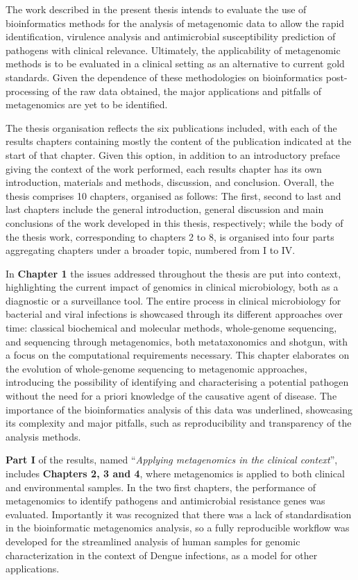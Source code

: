 The work described in the present thesis intends to evaluate the use of bioinformatics methods for the analysis of metagenomic data to allow the rapid identification, virulence analysis and antimicrobial susceptibility prediction of pathogens with clinical relevance. Ultimately, the applicability of metagenomic methods is to be evaluated in a clinical setting as an alternative to current gold standards. Given the dependence of these methodologies on bioinformatics post-processing of the raw data obtained, the major applications and pitfalls of metagenomics are yet to be identified. 

The thesis organisation reflects the six publications included, with each of the results chapters containing mostly the content of the publication indicated at the start of that chapter. Given this option, in addition to an introductory preface giving the context of the work performed, each results chapter has its own introduction, materials and methods, discussion, and conclusion. Overall, the thesis comprises 10 chapters, organised as follows: The first, second to last and last chapters include the general introduction, general discussion and main conclusions of the work developed in this thesis, respectively; while the body of the thesis work, corresponding to chapters 2 to 8, is organised into four parts aggregating chapters under a broader topic, numbered from I to IV.

In \textbf{Chapter 1} the issues addressed throughout the thesis are put into context, highlighting the current impact of genomics in clinical microbiology, both as a diagnostic or a surveillance tool. The entire process in clinical microbiology for bacterial and viral infections is showcased through its different approaches over time: classical biochemical and molecular methods, whole-genome sequencing, and sequencing through metagenomics, both metataxonomics and shotgun, with a focus on the computational requirements necessary. This chapter elaborates on the evolution of whole-genome sequencing to metagenomic approaches, introducing the possibility of identifying and characterising a potential pathogen without the need for a priori knowledge of the causative agent of disease. The importance of the bioinformatics analysis of this data was underlined, showcasing its complexity and major pitfalls, such as reproducibility and transparency of the analysis methods.   

\textbf{Part I} of the results, named “\textit{Applying metagenomics in the clinical context}”, includes \textbf{Chapters 2, 3 and 4}, where metagenomics is applied to both clinical and environmental samples. In the two first chapters, the performance of metagenomics to identify pathogens and antimicrobial resistance genes was evaluated. Importantly it was recognized that there was a lack of standardisation in the bioinformatic metagenomics analysis, so a fully reproducible workflow was developed for the streamlined analysis of human samples for genomic characterization in the context of Dengue infections, as a model for other applications.

